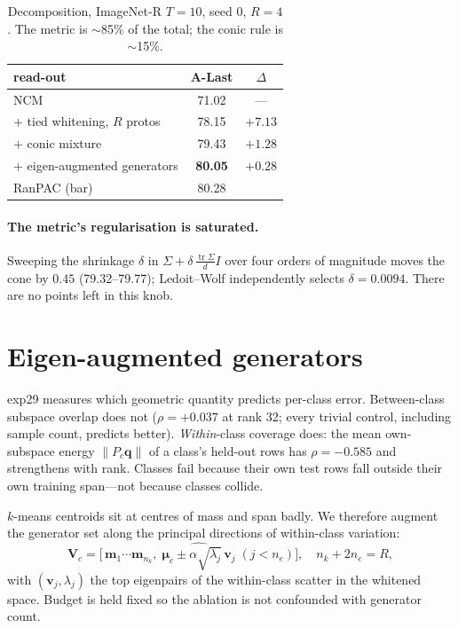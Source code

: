 \documentclass[10pt,twocolumn]{article}
\newcommand{\bq}{\mathbf{q}}
\newcommand{\bv}{\mathbf{v}}
\newcommand{\bmu}{\boldsymbol{\mu}}
\newcommand{\bV}{\mathbf{V}}
\begin{document}
\begin{table}[t]\centering\small
\begin{tabular}{lcc}
\toprule
read-out & A-Last & $\Delta$ \\
\midrule
NCM                                   & 71.02 & --- \\
\quad $+$ tied whitening, $R$ protos  & 78.15 & $+7.13$ \\
\quad $+$ conic mixture               & 79.43 & $+1.28$ \\
\quad $+$ eigen-augmented generators  & \textbf{80.05} & $+0.28$ \\
\midrule
RanPAC (bar)                          & 80.28 & \\
\bottomrule
\end{tabular}
\caption{Decomposition, ImageNet-R $T{=}10$, seed 0, $R{=}4$. The metric is
$\sim$85\% of the total; the conic rule is $\sim$15\%.}
\label{tab:decomp}
\end{table}

\paragraph{The metric's regularisation is saturated.} Sweeping the shrinkage
$\delta$ in $\Sigma + \delta\,\tfrac{\operatorname{tr}\Sigma}{d}I$ over four
orders of magnitude moves the cone by $0.45$ (79.32--79.77); Ledoit--Wolf
independently selects $\delta{=}0.0094$. There are no points left in this knob.

\section{Eigen-augmented generators}

exp29 measures which geometric quantity predicts per-class error. Between-class
subspace overlap does not ($\rho{=}{+}0.037$ at rank 32; every trivial control,
including sample count, predicts better). \emph{Within}-class coverage does: the
mean own-subspace energy $\lVert P_c\bq\rVert$ of a class's held-out rows has
$\rho={-}0.585$ and strengthens with rank. Classes fail because their own test
rows fall outside their own training span---not because classes collide.

$k$-means centroids sit at centres of mass and span badly. We therefore augment
the generator set along the principal directions of within-class variation:
\begin{equation}
\bV_c = \widehat{\Big[\,
\mathbf{m}_1 \cdots \mathbf{m}_{n_k},\;
\bmu_c \pm \alpha\sqrt{\lambda_j}\,\bv_j \;(j<n_e)\Big]},
\quad n_k + 2n_e = R,
\end{equation}
with $(\bv_j,\lambda_j)$ the top eigenpairs of the within-class scatter in the
whitened space. Budget is held fixed so the ablation is not confounded with
generator count.
\end{document}
